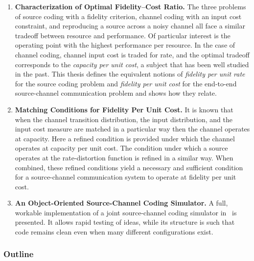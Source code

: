 \begin{enumerate}
  \item \textbf{Characterization of Optimal Fidelity--Cost Ratio.} The three
    problems of source coding with a fidelity criterion, channel coding with an
    input cost constraint, and reproducing a source across a noisy channel all
    face a similar tradeoff between resource and performance. Of particular
    interest is the operating point with the highest performance per resource.
    In the case of channel coding, channel input cost is traded for rate, and
    the optimal tradeoff corresponds to the \emph{capacity per unit cost}, a
    subject that has been well studied in the past. This thesis defines the
    equivalent notions of \emph{fidelity per unit rate} for the source coding
    problem and \emph{fidelity per unit cost} for the end-to-end source-channel
    communication problem and shows how they relate. 

  \item \textbf{Matching Conditions for Fidelity Per Unit Cost.} It is known
    that when the channel transition distribution, the input distribution, and
    the input cost measure are matched in a particular way then the channel
    operates at capacity. Here a refined condition is provided under which the
    channel operates at capacity per unit cost. The condition under which a
    source operates at the rate-distortion function is refined in a similar way.
    When combined, these refined conditions yield a necessary and sufficient
    condition for a source-channel communication system to operate at fidelity
    per unit cost. 

  \item \textbf{An Object-Oriented Source-Channel Coding Simulator.} A full,
    workable implementation of a joint source-channel coding simulator in
    \matlab\ is presented. It allows rapid testing of ideas, while its structure
    is such that code remains clean even when many different configurations
    exist. 

\end{enumerate}


\subsubsection{Outline}

